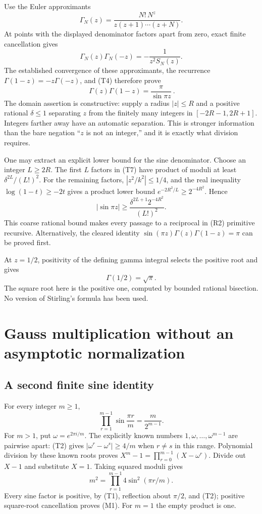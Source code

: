 Use the Euler approximants
\[
 \Gamma_N(z)=\frac{N!\,N^z}{z(z+1)\cdots(z+N)}.
\]
At points with the displayed denominator factors apart from zero, exact
finite cancellation gives
\[
 \Gamma_N(z)\Gamma_N(-z)
       =-\frac1{z^2S_N(z)}.                              \tag{R1}
\]
The established convergence of these approximants, the recurrence
\(\Gamma(1-z)=-z\Gamma(-z)\), and (T4) therefore prove
\[
 \boxed{\ \Gamma(z)\Gamma(1-z)=\frac\pi{\sin\pi z}\ }.              \tag{R2}
\]
The domain assertion is constructive: supply a radius \(|z|\le R\)
and a positive rational \(\delta\le1\) separating \(z\) from the
finitely many integers in \([-2R-1,2R+1]\). Integers farther away have
an automatic separation. This is stronger information than the bare
negation ``\(z\) is not an integer,'' and it is exactly what division
requires.

One may extract an explicit lower bound for the sine denominator.
Choose an integer \(L\ge2R\). The first \(L\) factors in (T7) have
product of moduli at least \(\delta^{2L}/(L!)^2\). For the remaining
factors, \(|z^2/k^2|\le1/4\), and the real inequality
\(\log(1-t)\ge-2t\) gives a product lower bound
\(e^{-2R^2/L}\ge2^{-4R^2}\). Hence
\[
 |\sin\pi z|\ge
       \frac{\delta^{2L+1}2^{-4R^2}}{(L!)^2}.             \tag{R3}
\]
This coarse rational bound makes every passage to a reciprocal in (R2)
primitive recursive. Alternatively, the cleared identity
\(\sin(\pi z)\Gamma(z)\Gamma(1-z)=\pi\) can be proved first.

At \(z=1/2\), positivity of the defining gamma integral selects the
positive root and gives
\[
 \boxed{\Gamma(1/2)=\sqrt\pi}.                           \tag{R4}
\]
The square root here is the positive one, computed by bounded rational
bisection. No version of Stirling's formula has been used.

\section{Gauss multiplication without an asymptotic normalization}

\subsection{A second finite sine identity}

For every integer \(m\ge1\),
\[
 \prod_{r=1}^{m-1}\sin\frac{\pi r}{m}
                 =\frac{m}{2^{m-1}}.                    \tag{M1}
\]
For \(m>1\), put \(\omega=e^{2\pi i/m}\). The explicitly known
numbers \(1,\omega,\ldots,\omega^{m-1}\) are pairwise apart: (T2)
gives \(|\omega^r-\omega^s|\ge4/m\) when \(r\ne s\) in this range.
Polynomial division by these known roots proves
\(X^m-1=\prod_{r=0}^{m-1}(X-\omega^r)\). Divide out \(X-1\) and
substitute \(X=1\). Taking squared moduli gives
\[
 m^2=\prod_{r=1}^{m-1}4\sin^2(\pi r/m).
\]
Every sine factor is positive, by (T1), reflection about \(\pi/2\),
and (T2); positive square-root cancellation proves (M1). For \(m=1\)
the empty product is one.

